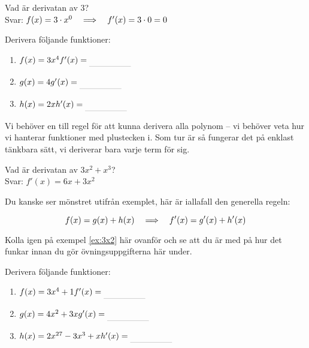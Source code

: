 \documentclass[a4paper, 12pt]{article}
\begin{document}
\begin{exempel}
    Vad är derivatan av $3$? \\ Svar: $f(x) = 3 \cdot x^0 \hspace{1em} \Longrightarrow \hspace{1em} f'(x) = 3 \cdot 0 = 0$
\end{exempel}

\begin{uppgifter}
    \label{upp:kx^n}
    Derivera följande funktioner:
    \begin{multicols}{3}
        \begin{enumerate}
            \item $f(x) = 3x^4 \\ f'(x) \ans$
            \item $g(x) = 4 \\ g'(x) \ans$
            \item $h(x) = 2x \\ h'(x) \ans$
        \end{enumerate}
    \end{multicols}
\end{uppgifter}

Vi behöver en till regel för att kunna derivera alla polynom -- vi behöver veta hur vi hanterar funktioner med plustecken i. Som tur är så fungerar det på enklast tänkbara sätt, vi deriverar bara varje term för sig.

\begin{exempel}
    \label{ex:3x2}
    Vad är derivatan av $3x^2 + x^3$? \\ Svar: $f'(x) = 6x + 3x^2$
\end{exempel}

Du kanske ser mönstret utifrån exemplet, här är iallafall den generella regeln:

\begin{regel}
    \label{reg:sum}
    \[ f(x) = g(x) + h(x) \hspace{1em} \Longrightarrow \hspace{1em} f'(x) = g'(x) + h'(x) \] 
\end{regel}

Kolla igen på exempel \ref*{ex:3x2} här ovanför och se att du är med på hur det funkar innan du gör övningsuppgifterna här under.

\begin{uppgifter}
    \label{upp:f+g}
    Derivera följande funktioner:
    \begin{multicols}{3}
        \begin{enumerate}
            \item $f(x) = 3x^4 + 1 \\ f'(x) \ans$
            \item $g(x) = 4x^2 + 3x \\ g'(x) \ans$
            \item $h(x) = 2x^{27} - 3x^3 + x \\ h'(x) \ans$
        \end{enumerate}
    \end{multicols}
\end{uppgifter}
\end{document}
